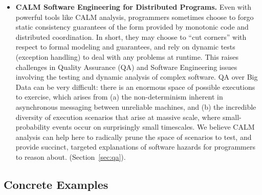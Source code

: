 \begin{itemize}
  \item \textbf{CALM Software Engineering for Distributed Programs.}  Even with powerful tools like CALM analysis, programmers sometimes choose to forgo static consistency guarantees of the form provided by monotonic code and distributed coordination.  In short, they may choose to ``cut corners'' with respect to formal modeling and guarantees, and rely on dynamic tests (exception handling) to deal with any problems at runtime.  This raises challenges in Quality Assurance (QA) and Software Engineering issues involving the testing and dynamic analysis of complex software.  QA over Big Data can be very difficult: there is an enormous space of possible executions to exercise, which arises from (a) the non-determinism inherent in asynchronous messaging between unreliable machines, and (b) the incredible diversity of execution scenarios that arise at massive scale, where small-probability events occur on surprisingly small timescales.  We believe CALM analysis can help here to radically prune the space of scenarios to test, and provide succinct, targeted explanations of software hazards for programmers to reason about.  (Section~\ref{sec:qa}).
\end{itemize}

\subsection{Concrete Examples}
